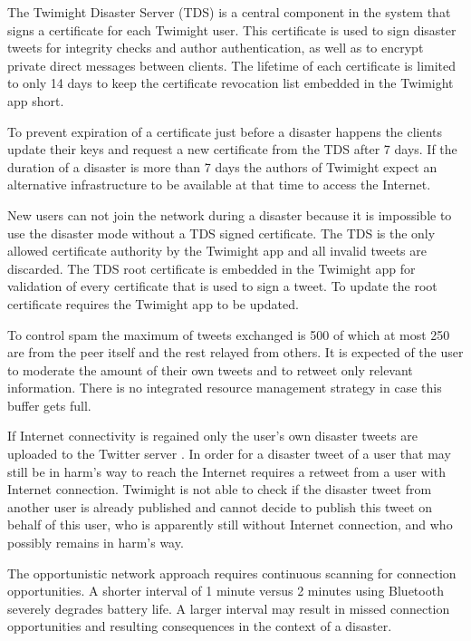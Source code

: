 \documentclass[conference,compsoc]{IEEEtran}
\begin{document}
The Twimight Disaster Server (TDS) is a central component in the system that signs a certificate for each Twimight user.
This certificate is used to sign disaster tweets for integrity checks and author authentication, as well as to encrypt private direct messages between clients.
The lifetime of each certificate is limited to only 14 days to keep the certificate revocation list embedded in the Twimight app short. \cite{Hossmann:2011:TDM:2079360.2079367}

To prevent expiration of a certificate just before a disaster happens the clients update their keys and request a new certificate from the TDS after 7 days.
If the duration of a disaster is more than 7 days the authors of Twimight expect an alternative infrastructure to be available at that time to access the Internet. \cite{Hossmann:2011:TDM:2079360.2079367}

New users can not join the network during a disaster because it is impossible to use the disaster mode without a TDS signed certificate.
The TDS is the only allowed certificate authority by the Twimight app and all invalid tweets are discarded.
The TDS root certificate is embedded in the Twimight app for validation of every certificate that is used to sign a tweet.
To update the root certificate requires the Twimight app to be updated. \cite{Hossmann:2011:TDM:2079360.2079367}

To control spam the maximum of tweets exchanged is 500 of which at most 250 are from the peer itself and the rest relayed from others.
It is expected of the user to moderate the amount of their own tweets and to retweet only relevant information.
There is no integrated resource management strategy in case this buffer gets full. \cite{Hossmann:2011:TDM:2079360.2079367}

If Internet connectivity is regained only the user's own disaster tweets are uploaded to the Twitter server \cite{Hossmann:2011:TDM:2079360.2079367}.
In order for a disaster tweet of a user that may still be in harm's way to reach the Internet requires a retweet from a user with Internet connection.
Twimight is not able to check if the disaster tweet from another user is already published and cannot decide to publish this tweet on behalf of this user, who is apparently still without Internet connection, and who possibly remains in harm's way.

The opportunistic network approach requires continuous scanning for connection opportunities.
A shorter interval of 1 minute versus 2 minutes using Bluetooth severely degrades battery life.
A larger interval may result in missed connection opportunities and resulting consequences in the context of a disaster.
\end{document}
